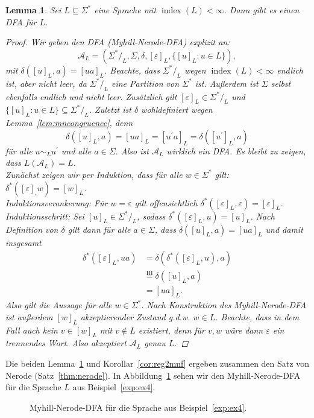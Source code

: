 \documentclass[11pt, a4paper]{article}
\theoremstyle{definition}
\theoremstyle{plain}
\newtheorem{lemma}[definition]{Lemma}
\numberwithin{equation}{section}
\DeclareMathOperator{\ind}{index}
\begin{document}
\begin{lemma}\label{lem:mnf2reg}
	Sei $L \subseteq \Sigma^\ast$ eine Sprache mit $\ind(L) < \infty$. Dann gibt es einen DFA für $L$.
	\begin{proof}
		Wir geben den DFA (\textit{Myhill-Nerode-DFA}) explizit an:
		$$
			\mathcal{A}_L = (\Sigma^\ast/_L, \Sigma, \delta, [\varepsilon]_L, \{[u]_L : u \in L\}),
		$$
		mit $\delta([u]_L, a) = [ua]_L$. Beachte, dass $\Sigma^\ast/_L$ wegen $\ind(L) < \infty$ endlich ist, aber nicht leer, da $\Sigma^\ast/_L$ eine Partition von $\Sigma^\ast$ ist. Außerdem ist $\Sigma$ selbst ebenfalls endlich und nicht leer. Zusätzlich gilt $[\varepsilon]_L \in \Sigma^\ast/_L$ und $\{[u]_L : u \in L\} \subseteq \Sigma^\ast/_L$. Zuletzt ist $\delta$ wohldefiniert wegen Lemma~\ref{lem:mncongruence}, denn 
		$$
			\delta([u]_L, a) = [ua]_L = [u^\prime a]_L = \delta([u^\prime]_L, a)
		$$
		für alle $u \sim_L u^\prime$ und alle $a \in \Sigma$. Also ist $\mathcal{A}_L$ wirklich ein DFA. Es bleibt zu zeigen, dass $L(\mathcal{A}_L) = L$.\\
		Zunächst zeigen wir per Induktion, dass für alle $w \in \Sigma^\ast$ gilt: $\delta^\ast([\varepsilon]_, w) = [w]_L$.\\
		Induktionsverankerung: Für $w = \varepsilon$ gilt offensichtlich $\delta^\ast([\varepsilon]_L, \varepsilon) = [\varepsilon]_L$. \checkmark\\
		Induktionsschritt: Sei $[u]_L \in \Sigma^\ast/_L$, sodass $\delta^\ast([\varepsilon]_L, u) = [u]_L$. Nach Definition von $\delta$ gilt dann für alle $a \in \Sigma$, dass $\delta([u]_L, a) = [ua]_L$ und damit insgesamt
		\begin{align*}
			\delta^\ast([\varepsilon]_L, ua) &= \delta(\delta^\ast([\varepsilon]_L, u), a)\\
			&\overset{\text{IH}}{=} \delta([u]_L, a)\\
			&= [ua]_L.
		\end{align*}
		Also gilt die Aussage für alle $w \in \Sigma^\ast$. Nach Konstruktion des Myhill-Nerode-DFA ist außerdem $[w]_L$ akzeptierender Zustand g.d.w. $w \in L$. Beachte, dass in dem Fall auch kein $v \in [w]_L$ mit $v \notin L$ existiert, denn für $v, w$ wäre dann $\varepsilon$ ein trennendes Wort. Also akzeptiert $\mathcal{A}_L$ genau $L$.
	\end{proof}
\end{lemma}
Die beiden Lemma~\ref{lem:mnf2reg} und Korollar~\ref{cor:reg2mnf} ergeben zusammen den Satz von Nerode (Satz~\ref{thm:nerode}). In Abbildung~\ref{fig:mndfa} sehen wir den Myhill-Nerode-DFA für die Sprache $L$ aus Beispiel~\ref{exp:ex4}.
\begin{figure}
	\centering
	
	\caption{Myhill-Nerode-DFA für die Sprache aus Beispiel~\ref{exp:ex4}.}
	\label{fig:mndfa}
\end{figure}
\end{document}
